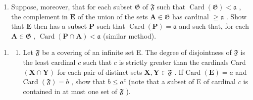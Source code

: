\begin{enumerate}
\def\labelenumi{(\alph{enumi})}
\setcounter{enumi}{1}
\tightlist
\item
  Suppose, moreover, that for each subset \(\mathfrak{G}\) of \(\mathfrak{F}\) such that \(\operatorname{Card}(\mathfrak{G}) < \mathfrak{a}\) , the complement in \(\mathbf{E}\) of the union of the sets \(\mathbf{A} \in \mathfrak{G}\) has cardinal \(\geqslant \mathfrak{a}\) . Show that \(\mathbf{E}\) then has a subset \(\mathbf{P}\) such that \(\operatorname{Card}(\mathbf{P}) = \mathfrak{a}\) and such that, for each \(\mathbf{A} \in \mathfrak{G}\) , \(\operatorname{Card}(\mathbf{P} \cap \mathbf{A}) < \mathfrak{a}\) (similar method).
\end{enumerate}

\begin{enumerate}
\def\labelenumi{\arabic{enumi}.}
\setcounter{enumi}{24}
\tightlist
\item
  \begin{enumerate}
  \def\labelenumii{(\alph{enumii})}
  \tightlist
  \item
    Let \(\mathfrak{F}\) be a covering of an infinite set E. The degree of disjointness of \(\mathfrak{F}\) is the least cardinal \(c\) such that \(c\) is strictly greater than the cardinals Card \((\mathbf{X} \cap \mathbf{Y})\) for each pair of distinct sets \(\mathbf{X}, \mathbf{Y} \in \mathfrak{F}\) . If Card \((\mathbf{E}) = a\) and Card \((\mathfrak{F}) = b\) , show that \(b \leqslant a^c\) (note that a subset of E of cardinal \(c\) is contained in at most one set of \(\mathfrak{F}\) ).
  \end{enumerate}
\end{enumerate}

